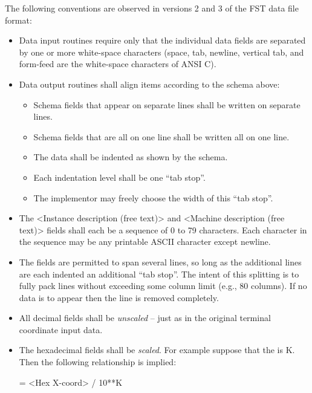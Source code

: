 \documentclass[12pt,twoside,letterpaper]{article}
\def\code#1{{\ttfamily #1}}
\begin{document}
\newpage
\def\code#1{{\footnotesize\ttfamily #1}}
The following conventions are observed in versions 2 and 3 of the FST
data file format:
\begin{itemize}
\item 
  Data input routines require only that the individual data fields are
  separated by one or more white-space characters (space, tab, newline,
  vertical tab, and form-feed are the white-space characters of ANSI C).
\item
  Data output routines shall align items according to the schema
  above:
  \begin{itemize}
  \item Schema fields that appear on separate lines shall be written on
    separate lines.
  \item Schema fields that are all on one line shall be written all on one
    line.
  \item The data shall be indented as shown by the schema.
  \item Each indentation level shall be one ``tab stop''.
  \item The implementor may freely choose the width of this ``tab stop''.
  \end{itemize}

\item
  The \code{<Instance description (free text)>} and
  \code{<Machine description (free text)>} fields shall each be a sequence of
  0 to 79 characters.  Each character in the sequence may be any
  printable ASCII character except newline.

\item 
  The \code{<on one line separated by spaces>} fields are permitted to span
  several lines, so long as the additional lines are each indented an
  additional ``tab stop''.  The intent of this splitting is to fully pack
  lines without exceeding some column limit (e.g., 80 columns).
  If no data is to appear then the line is removed completely.

\item 
  All decimal fields shall be {\em unscaled} -- just as in the original
  terminal coordinate input data.

\item 
  The hexadecimal fields shall be {\em scaled}.  For example suppose that
  the \code{<Coordinate scaling factor>} is K.  Then the following
  relationship is implied:
  
  \centerline{\small\code{<Dec X-coord> = <Hex X-coord> / 10**K}}


\end{itemize}
\end{document}
